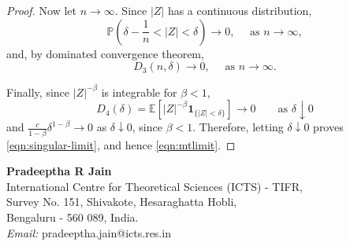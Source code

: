 \documentclass{article}[12pt]
\theoremstyle{definition}
\newcommand{\1}{\mathbbm{1}}
\begin{document}
\begin{proof}
Now let $n\to\infty$. Since $|Z|$ has a continuous distribution,
$$
\mathbb{P}\left(\delta-\frac1n<|Z|<\delta\right)\longrightarrow0, \quad \text{ as } n\to \infty,
$$
and, by dominated convergence theorem,
$$
D_3(n,\delta)\longrightarrow0 , \quad \text{ as } n\to \infty.
$$

Finally, since $|Z|^{-\beta}$ is integrable for $\beta<1$,
$$
D_4(\delta)=\mathbb{E}\left[|Z|^{-\beta}\mathbf{1}_{\{|Z|<\delta\}}\right]\longrightarrow0\qquad\text{as }\delta\downarrow0
$$
and $\frac{c}{1-\beta}\delta^{1-\beta} \to 0$ as $\delta\downarrow0$, since $\beta<1$.
Therefore, letting $\delta\downarrow0$ proves \eqref{eqn:singular-limit}, and hence \eqref{eqn:mtlimit}. \end{proof}






\bigskip
\noindent
\textbf{Pradeeptha R Jain}\\
International Centre for Theoretical Sciences (ICTS) - TIFR,\\
Survey No. 151, Shivakote, Hesaraghatta Hobli,\\
Bengaluru - 560 089, India.\\
\textit{Email:} pradeeptha.jain@icts.res.in\\
\end{document}
